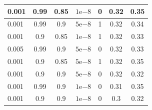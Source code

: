 \begin{table}[]
\begin{tabular}{lcccc|cc|}
\multicolumn{1}{|l|}{0.001}                         & \multicolumn{1}{c|}{0.99}                        & \multicolumn{1}{c|}{0.85}                         & \multicolumn{1}{c|}{$1\mathrm{e}{-8}$}                         & 0       & \multicolumn{1}{c|}{0.32}                         & 0.35    \\ \hline
\multicolumn{1}{|l|}{0.001}                         & \multicolumn{1}{c|}{0.99}                        & \multicolumn{1}{c|}{0.9}                          & \multicolumn{1}{c|}{$5\mathrm{e}{-8}$}                         & 1       & \multicolumn{1}{c|}{0.32}                         & 0.34    \\ \hline
\multicolumn{1}{|l|}{0.001}                         & \multicolumn{1}{c|}{0.9}                         & \multicolumn{1}{c|}{0.85}                         & \multicolumn{1}{c|}{$1\mathrm{e}{-8}$}                         & 1       & \multicolumn{1}{c|}{0.32}                         & 0.33    \\ \hline
\multicolumn{1}{|l|}{0.005}                         & \multicolumn{1}{c|}{0.99}                        & \multicolumn{1}{c|}{0.9}                          & \multicolumn{1}{c|}{$5\mathrm{e}{-8}$}                         & 0       & \multicolumn{1}{c|}{0.32}                         & 0.33    \\ \hline
\multicolumn{1}{|l|}{0.001}                         & \multicolumn{1}{c|}{0.9}                         & \multicolumn{1}{c|}{0.85}                         & \multicolumn{1}{c|}{$5\mathrm{e}{-8}$}                         & 1       & \multicolumn{1}{c|}{0.32}                         & 0.35    \\ \hline
\multicolumn{1}{|l|}{0.001}                         & \multicolumn{1}{c|}{0.9}                         & \multicolumn{1}{c|}{0.9}                          & \multicolumn{1}{c|}{$5\mathrm{e}{-8}$}                         & 0       & \multicolumn{1}{c|}{0.32}                         & 0.32    \\ \hline
\multicolumn{1}{|l|}{0.001}                         & \multicolumn{1}{c|}{0.99}                        & \multicolumn{1}{c|}{0.9}                          & \multicolumn{1}{c|}{$1\mathrm{e}{-8}$}                         & 0       & \multicolumn{1}{c|}{0.31}                         & 0.35    \\ \hline
\multicolumn{1}{|l|}{0.001}                         & \multicolumn{1}{c|}{0.9}                         & \multicolumn{1}{c|}{0.9}                          & \multicolumn{1}{c|}{$1\mathrm{e}{-8}$}                         & 0       & \multicolumn{1}{c|}{0.3}                          & 0.32    \\ \hline

\end{tabular}
\end{table}
